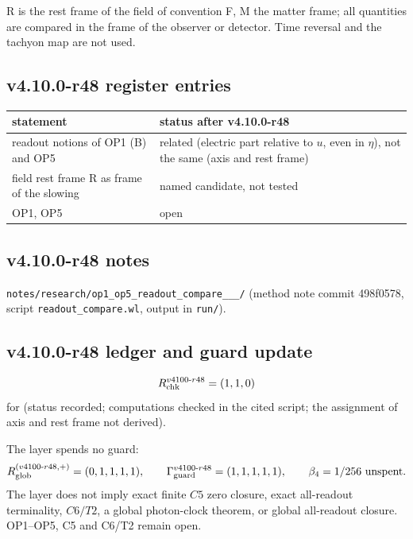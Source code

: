 R is the rest frame of the field of convention F, M the matter frame; all quantities are compared in the frame of the observer or detector.  Time
reversal and the tachyon map are not used.

\subsection*{v4.10.0-r48 register entries}
\label{subsec:v4100-r48-register}

\begin{center}
\small
\begin{tabular}{@{}>{\raggedright\arraybackslash}p{}>{\raggedright\arraybackslash}p{}@{}}
\toprule
statement & status after v4.10.0-r48\\
\midrule
readout notions of OP1 (B) and OP5 & related (electric part relative to \(u\), even in \(\eta\)), not the same (axis and rest frame)\\
field rest frame R as frame of the slowing & named candidate, not tested\\
OP1, OP5 & open\\
\bottomrule
\end{tabular}
\end{center}

\subsection*{v4.10.0-r48 notes}
\label{subsec:v4100-r48-notes}

\texttt{notes/\allowbreak research/\allowbreak op1\_\allowbreak op5\_\allowbreak readout\_\allowbreak compare\_\_\_/} (method note commit 498f0578,
script \texttt{readout\_\allowbreak compare.wl}, output in \texttt{run/}).

\subsection*{v4.10.0-r48 ledger and guard update}
\label{subsec:v4100-r48-ledger-guard}

\[
R_{\rm chk}^{v4100\text{-}r48}=(1,1,0)
\]
for (status recorded; computations checked in the cited script; the assignment of axis and rest frame not derived).

The layer spends no guard:
\[
R_{\rm glob}^{(v4100\text{-}r48,+)}=(0,1,1,1,1),
\qquad
\Gamma_{\rm guard}^{v4100\text{-}r48}=(1,1,1,1,1),
\qquad
\beta_4=1/256\ \text{unspent}.
\]
The layer does not imply exact finite \(C5\) zero closure, exact all-readout terminality, \(C6/T2\), a global photon-clock theorem,
or global all-readout closure.  OP1--OP5, C5 and C6/T2 remain open.

